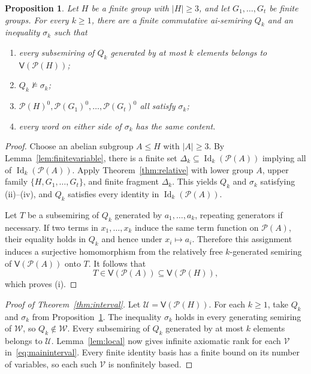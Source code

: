 \documentclass[11pt,reqno]{amsart}
\newtheorem{proposition}[theorem]{Proposition}
\theoremstyle{definition}
\numberwithin{equation}{section}
\newcommand{\Pow}{\mathcal{P}}
\newcommand{\Full}[1]{\mathcal{P}(#1)^0}
\newcommand{\Var}{\mathsf{V}}
\newcommand{\Id}{\operatorname{Id}}
\newcommand{\calU}{\mathcal{U}}
\newcommand{\calV}{\mathcal{V}}
\newcommand{\calW}{\mathcal{W}}
\renewcommand{\leq}{\leqslant}
\renewcommand{\geq}{\geqslant}
\begin{document}
\begin{proposition}\label{prop:localwitness}
Let $H$ be a finite group with $|H|\geq 3$, and let $G_1,\ldots,G_t$ be finite groups. For every $k\geq 1$, there are a finite commutative ai-semiring $Q_k$ and an inequality $\sigma_k$ such that
\begin{enumerate}[label=\textup{(\roman*)},leftmargin=2.4em]
\item every subsemiring of $Q_k$ generated by at most $k$ elements belongs to $\Var(\Pow(H))$;
\item $Q_k\not\models\sigma_k$;
\item $\Full{H},\Full{G_1},\ldots,\Full{G_t}$ all satisfy $\sigma_k$;
\item every word on either side of $\sigma_k$ has the same content.
\end{enumerate}
\end{proposition}
\begin{proof}
Choose an abelian subgroup $A\leq H$ with $|A|\geq 3$. By Lemma~\ref{lem:finitevariable}, there is a finite set $\Delta_k\subseteq\Id_k(\Pow(A))$ implying all of $\Id_k(\Pow(A))$. Apply Theorem~\ref{thm:relative} with lower group $A$, upper family $\{H,G_1,\ldots,G_t\}$, and finite fragment $\Delta_k$. This yields $Q_k$ and $\sigma_k$ satisfying (ii)--(iv), and $Q_k$ satisfies every identity in $\Id_k(\Pow(A))$.

Let $T$ be a subsemiring of $Q_k$ generated by $a_1,\ldots,a_k$, repeating generators if necessary. If two terms in $x_1,\ldots,x_k$ induce the same term function on $\Pow(A)$, their equality holds in $Q_k$ and hence under $x_i\mapsto a_i$. Therefore this assignment induces a surjective homomorphism from the relatively free $k$-generated semiring of $\Var(\Pow(A))$ onto $T$. It follows that
\[
 T\in\Var(\Pow(A))\subseteq\Var(\Pow(H)),
\]
which proves (i).
\end{proof}

\begin{proof}[Proof of Theorem~\ref{thm:interval}]
Let $\calU=\Var(\Pow(H))$. For each $k\geq 1$, take $Q_k$ and $\sigma_k$ from Proposition~\ref{prop:localwitness}. The inequality $\sigma_k$ holds in every generating semiring of $\calW$, so $Q_k\notin\calW$. Every subsemiring of $Q_k$ generated by at most $k$ elements belongs to $\calU$. Lemma~\ref{lem:local} now gives infinite axiomatic rank for each $\calV$ in~\eqref{eq:maininterval}. Every finite identity basis has a finite bound on its number of variables, so each such $\calV$ is nonfinitely based.
\end{proof}
\end{document}
